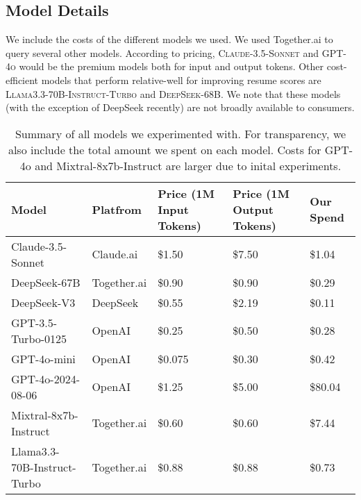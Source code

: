     \subsection{Model Details}
    We include the costs of the different models we used. We used Together.ai to query several other models. According to pricing, \textsc{Claude-3.5-Sonnet} and \textsc{GPT-4o} would be the premium models both for input and output tokens. Other cost-efficient models that perform relative-well for improving resume scores are \textsc{Llama3.3-70B-Instruct-Turbo} and \textsc{DeepSeek-68B}. We note that these models (with the exception of DeepSeek recently) are not broadly available to consumers. 
    \begin{table}[]
        \centering
\begin{tabular}{llp{3cm}p{3cm}p{1cm}}
\toprule
\textbf{Model}              & \textbf{Platfrom} & \textbf{Price (1M Input Tokens)} & \textbf{Price (1M Output Tokens)} & \textbf{Our Spend} \\ \hline
Claude-3.5-Sonnet           & Claude.ai         & \$1.50                           & \$7.50                            & \$1.04             \\
DeepSeek-67B                & Together.ai       & \$0.90                           & \$0.90                            & \$0.29             \\
DeepSeek-V3                & DeepSeek       & \$0.55                           & \$2.19                            & \$0.11             \\
GPT-3.5-Turbo-0125          & OpenAI            & \$0.25                           & \$0.50                            & \$0.28             \\
GPT-4o-mini                 & OpenAI            & \$0.075                          & \$0.30                            & \$0.42             \\
GPT-4o-2024-08-06           & OpenAI            & \$1.25                           & \$5.00                            & \$80.04            \\
Mixtral-8x7b-Instruct       & Together.ai       & \$0.60                           & \$0.60                            & \$7.44             \\
Llama3.3-70B-Instruct-Turbo & Together.ai       & \$0.88                           & \$0.88                            & \$0.73            \\ \bottomrule
\end{tabular}
        \caption{Summary of all models we experimented with. For transparency, we also include the total amount we spent on each model. Costs for GPT-4o and Mixtral-8x7b-Instruct are larger due to inital experiments.}
        \label{tab:API-summary}
    \end{table}
